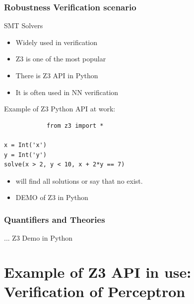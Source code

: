 \documentclass{beamer}
\begin{document}
	\begin{frame}[fragile]
      \frametitle{Robustness Verification scenario}
			\begin{block}{SMT Solvers}
			
			\begin{itemize}
				\item Widely used in verification \pause
				\item Z3 is one of the most popular \pause
				\item There is Z3 API in Python \pause
				\item It is often used in NN verification \pause
			\end{itemize}
			\end{block}
			\alert{Example of Z3 Python API at work:}
			\begin{verbatim}
			from z3 import *

x = Int('x')
y = Int('y')
solve(x > 2, y < 10, x + 2*y == 7)

			\end{verbatim}
			\pause
			
			\begin{itemize}
                        \item will find all solutions or say that no exist.
                          \item \alert{DEMO of Z3 in Python}
			\end{itemize}
                      \end{frame}

\begin{frame}
  \frametitle{Quantifiers and Theories}
  ... Z3 Demo in Python
\end{frame}

\section{Example of Z3 API in use: Verification of Perceptron}
\end{document}
